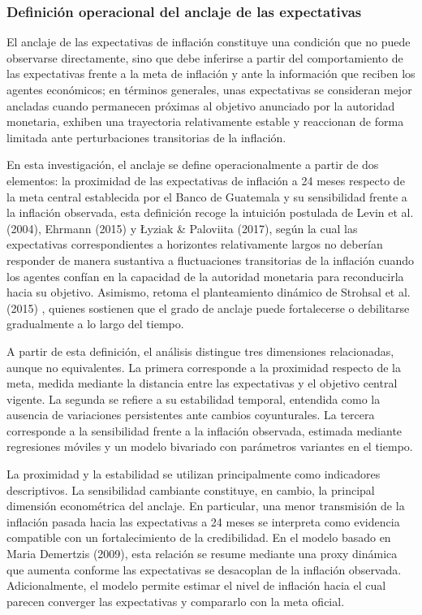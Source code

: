 \documentclass[
  10.5pt,
  letterpaper,
  twocolumn]{article}
\begin{document}
\subsubsection{Definición operacional del anclaje de las
expectativas}\label{definiciuxf3n-operacional-del-anclaje-de-las-expectativas}

El anclaje de las expectativas de inflación constituye una condición que
no puede observarse directamente, sino que debe inferirse a partir del
comportamiento de las expectativas frente a la meta de inflación y ante
la información que reciben los agentes económicos; en términos
generales, unas expectativas se consideran mejor ancladas cuando
permanecen próximas al objetivo anunciado por la autoridad monetaria,
exhiben una trayectoria relativamente estable y reaccionan de forma
limitada ante perturbaciones transitorias de la inflación.

En esta investigación, el anclaje se define operacionalmente a partir de
dos elementos: la proximidad de las expectativas de inflación a 24 meses
respecto de la meta central establecida por el Banco de Guatemala y su
sensibilidad frente a la inflación observada, esta definición recoge la
intuición postulada de Levin et al. (2004), Ehrmann (2015) y Łyziak \&
Paloviita (2017), según la cual las expectativas correspondientes a
horizontes relativamente largos no deberían responder de manera
sustantiva a fluctuaciones transitorias de la inflación cuando los
agentes confían en la capacidad de la autoridad monetaria para
reconducirla hacia su objetivo. Asimismo, retoma el planteamiento
dinámico de Strohsal et al. (2015) , quienes sostienen que el grado de
anclaje puede fortalecerse o debilitarse gradualmente a lo largo del
tiempo.

A partir de esta definición, el análisis distingue tres dimensiones
relacionadas, aunque no equivalentes. La primera corresponde a la
proximidad respecto de la meta, medida mediante la distancia entre las
expectativas y el objetivo central vigente. La segunda se refiere a su
estabilidad temporal, entendida como la ausencia de variaciones
persistentes ante cambios coyunturales. La tercera corresponde a la
sensibilidad frente a la inflación observada, estimada mediante
regresiones móviles y un modelo bivariado con parámetros variantes en el
tiempo.

La proximidad y la estabilidad se utilizan principalmente como
indicadores descriptivos. La sensibilidad cambiante constituye, en
cambio, la principal dimensión econométrica del anclaje. En particular,
una menor transmisión de la inflación pasada hacia las expectativas a 24
meses se interpreta como evidencia compatible con un fortalecimiento de
la credibilidad. En el modelo basado en Maria Demertzis (2009), esta
relación se resume mediante una proxy dinámica que aumenta conforme las
expectativas se desacoplan de la inflación observada. Adicionalmente, el
modelo permite estimar el nivel de inflación hacia el cual parecen
converger las expectativas y compararlo con la meta oficial.
\end{document}
